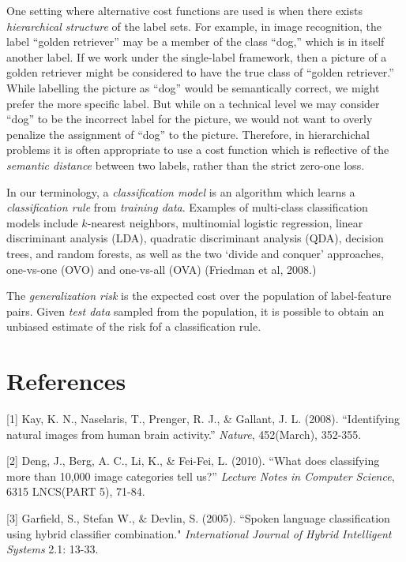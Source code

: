 \documentclass[12pt]{article}
\begin{document}
One setting where alternative cost functions are used is when there
exists \emph{hierarchical structure} of the label sets.  For example,
in image recognition, the label ``golden retriever'' may be a member
of the class ``dog,'' which is in itself another label.  If we work
under the single-label framework, then a picture of a golden retriever
might be considered to have the true class of ``golden retriever.''
While labelling the picture as ``dog'' would be semantically correct,
we might prefer the more specific label.  But while on a technical
level we may consider ``dog'' to be the incorrect label for the
picture, we would not want to overly penalize the assignment of
``dog'' to the picture.  Therefore, in hierarchichal problems it is
often appropriate to use a cost function which is reflective of
the \emph{semantic distance} between two labels, rather than the
strict zero-one loss.

In our terminology, a \emph{classification model} is an algorithm
which learns a \emph{classification rule} from \emph{training data}.
Examples of multi-class classification models include $k$-nearest
neighbors, multinomial logistic regression, linear discriminant
analysis (LDA), quadratic discriminant analysis (QDA), decision trees,
and random forests, as well as the two `divide and conquer'
approaches, one-vs-one (OVO) and one-vs-all (OVA) (Friedman et al,
2008.)

The \emph{generalization risk} is the expected cost over the
population of label-feature pairs.  Given \emph{test data} sampled
from the population, it is possible to obtain an unbiased estimate of
the risk fof a classification rule.


\section*{References}

\small

[1] Kay, K. N., Naselaris, T., Prenger, R. J., \& Gallant, J. L. (2008). ``Identifying natural images from human brain activity.'' 
\emph{Nature}, 452(March), 352-355.

[2] Deng, J., Berg, A. C., Li, K., \& Fei-Fei, L. (2010). ``What does classifying more than 10,000 image categories tell us?'' \emph{Lecture Notes in Computer Science}, 6315 LNCS(PART 5), 71-84. 

[3] Garfield, S., Stefan W., \& Devlin, S. (2005). ``Spoken language classification using hybrid classifier combination." 
\emph{International Journal of Hybrid Intelligent Systems} 2.1: 13-33.
\end{document}
